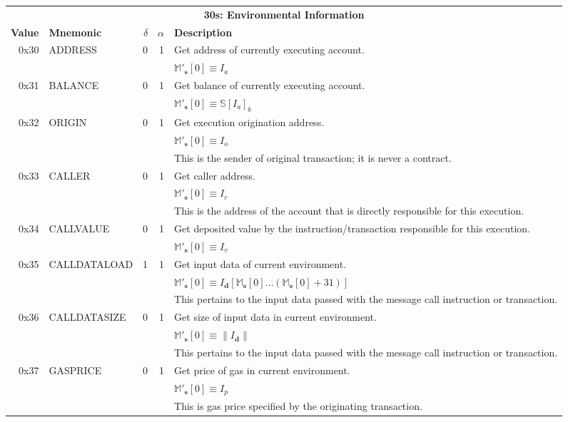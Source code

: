 \documentclass[9pt,oneside]{amsart}
\begin{document}
\begin{tabular*}{\columnwidth}[h]{rlrrl}
\toprule
\multicolumn{5}{c}{\textbf{30s: Environmental Information}} \vspace{5pt} \\
\textbf{Value} & \textbf{Mnemonic} & $\delta$ & $\alpha$ & \textbf{Description} \vspace{5pt} \\
0x30 & {\small ADDRESS} & 0 & 1 & Get address of currently executing account. \\
&&&& $\mathbb{M}'_\mathbf{s}[0] \equiv I_a$ \\
\midrule
0x31 & {\small BALANCE} & 0 & 1 & Get balance of currently executing account. \\
&&&& $\mathbb{M}'_\mathbf{s}[0] \equiv \mathbb{S}[I_a]_b$ \\
\midrule
0x32 & {\small ORIGIN} & 0 & 1 & Get execution origination address. \\
&&&& $\mathbb{M}'_\mathbf{s}[0] \equiv I_o$ \\
&&&& This is the sender of original transaction; it is never a contract. \\
\midrule
0x33 & {\small CALLER} & 0 & 1 & Get caller address. \\
&&&& $\mathbb{M}'_\mathbf{s}[0] \equiv I_c$ \\
&&&& This is the address of the account that is directly responsible for this execution. \\
\midrule
0x34 & {\small CALLVALUE} & 0 & 1 & Get deposited value by the instruction/transaction responsible for this execution. \\
&&&& $\mathbb{M}'_\mathbf{s}[0] \equiv I_v$ \\
\midrule
0x35 & {\small CALLDATALOAD} & 1 & 1 & Get input data of current environment. \\
&&&& $\mathbb{M}'_\mathbf{s}[0] \equiv I_\mathbf{d}[ \mathbb{M}_\mathbf{s}[0] \dots (\mathbb{M}_\mathbf{s}[0] + 31) ]$ \\
&&&& This pertains to the input data passed with the message call instruction or transaction. \\
\midrule
0x36 & {\small CALLDATASIZE} & 0 & 1 & Get size of input data in current environment. \\
&&&& $\mathbb{M}'_\mathbf{s}[0] \equiv \lVert I_\mathbf{d} \rVert$ \\
&&&& This pertains to the input data passed with the message call instruction or transaction. \\
\midrule
0x37 & {\small GASPRICE} & 0 & 1 & Get price of gas in current environment. \\
&&&& $\mathbb{M}'_\mathbf{s}[0] \equiv I_p$ \\
&&&& This is gas price specified by the originating transaction.\\
\bottomrule
\end{tabular*}
\end{document}
